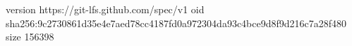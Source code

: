 version https://git-lfs.github.com/spec/v1
oid sha256:9c2730861d35e4e7aed78cc4187fd0a972304da93c4bce9d8f9d216c7a28f480
size 156398
